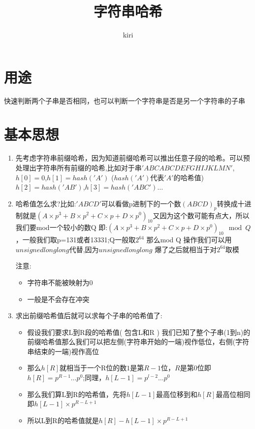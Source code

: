 \documentclass{ctexart}
\title{字符串哈希}
\author{kiri}
\begin{document}
\maketitle
\section{用途}
快速判断两个子串是否相同，也可以判断一个字符串是否是另一个字符串的子串
\section{基本思想}
\begin{enumerate}
    \item 先考虑字符串前缀哈希，因为知道前缀哈希可以推出任意子段的哈希。可以预处理出字符串所有前缀的哈希,比如对于串$'ABCABCDEFGHIJKLMN'$,$h[0]=0$,$h[1]=hash('A')$ ($hash('A')$代表$'A'$的哈希值)
    $h[2]=hash('AB')$,$h[3]=hash('ABC')\ldots$
    \item 哈希值怎么求?比如:$'ABCD'$可以看做p进制下的一个数$ (ABCD)_{p} $转换成十进制就是$(A\times p^3+ B\times p^2 +C\times p+ D\times p^0)_{10}$又因为这个数可能有点大，所以我们要mod一个较小的数Q
    即:$(A\times p^3+ B\times p^2 +C\times p+ D\times p^0)_{10} \mod Q$，一般我们取p=131或者13331;Q一般取$ 2^{64} $ 那么mod Q 操作我们可以用$unsigned long long $代替,因为$unsigned long long $ 爆了之后就相当于对$2^{64}$取模
    \par 注意:
    \begin{itemize}
        \item 字符串不能被映射为0
        \item 一般是不会存在冲突
    \end{itemize}
    \item 求出前缀哈希值后就可以求每个子串的哈希值了:
    \begin{itemize}
        \item 假设我们要求L到R段的哈希值( 包含L和R ) 我们已知了整个子串(1到n)的前缀哈希值那么我们可以把左侧(字符串开始的一端)视作低位，右侧(字符串结束的一端)视作高位
        \item 那么$h[R]$就相当于一个R位的数$1$是第$R-1$位，$R$是第0位即$h[R]=p^{R-1}\ldots p^{0}$;同理，$h[L-1]=p^{l-2}\ldots p^{0}$
        \item 那么我们算L到R的哈希值，先将$h[L-1]$最高位移到和$h[R]$最高位相同即$h[L-1]\times p^{R-L+1}$
        \item 所以L到R的哈希值就是$h[R]-h[L-1]\times p^{R-L+1}$
    \end{itemize}
   
\end{enumerate}
\end{document}
